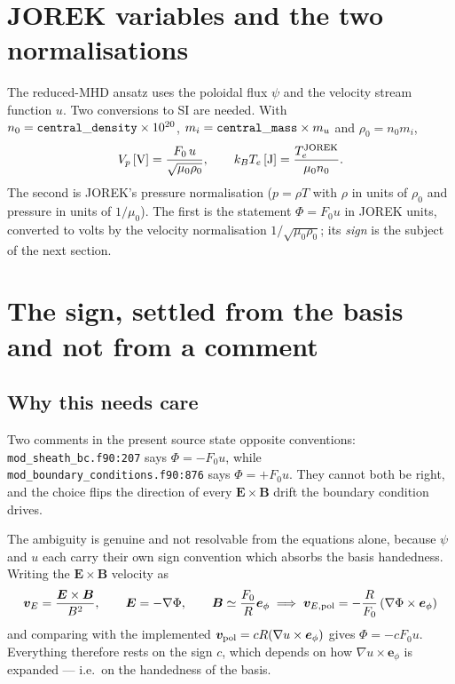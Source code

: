 \documentclass[11pt,a4paper]{article}
\newcommand{\code}[1]{\texttt{\small #1}}
\newcommand{\ephi}{\bm{e}_\phi}
\begin{document}
\section{JOREK variables and the two normalisations}

The reduced-MHD ansatz uses the poloidal flux $\psi$ and the velocity stream function $u$. Two
conversions to SI are needed. With $n_0={\tt central\_density}\times10^{20}$,
$m_i={\tt central\_mass}\times m_u$ and $\rho_0=n_0m_i$,
\begin{equation}
  V_p\,[\mathrm{V}]=\frac{F_0\,u}{\sqrt{\mu_0\rho_0}},
  \qquad
  k_BT_e\,[\mathrm{J}]=\frac{T_e^{\rm JOREK}}{\mu_0 n_0}.
  \label{eq:norm}
\end{equation}
The second is JOREK's pressure normalisation ($p=\rho T$ with $\rho$ in units of $\rho_0$ and
pressure in units of $1/\mu_0$). The first is the statement $\Phi=F_0u$ in JOREK units, converted
to volts by the velocity normalisation $1/\sqrt{\mu_0\rho_0}$; its \emph{sign} is the subject of
the next section.

\section{The sign, settled from the basis and not from a comment}
\label{sec:sign}

\subsection{Why this needs care}

Two comments in the present source state opposite conventions:
\code{mod\_sheath\_bc.f90:207} says $\Phi=-F_0u$, while
\code{mod\_boundary\_conditions.f90:876} says $\Phi=+F_0u$. They cannot both be right, and the
choice flips the direction of every $\bm{E}\times\bm{B}$ drift the boundary condition drives.

The ambiguity is genuine and not resolvable from the equations alone, because $\psi$ and $u$ each
carry their own sign convention which absorbs the basis handedness. Writing the $\bm{E}\times\bm{B}$
velocity as
\begin{equation}
  \bm{v}_E=\frac{\bm{E}\times\bm{B}}{B^2},\qquad \bm{E}=-\nabla\Phi,
  \qquad
  \bm{B}\simeq\frac{F_0}{R}\ephi
  \;\Longrightarrow\;
  \bm{v}_{E,\rm pol}=-\frac{R}{F_0}\left(\nabla\Phi\times\ephi\right)
\end{equation}
and comparing with the implemented $\bm{v}_{\rm pol}=cR(\nabla u\times\ephi)$ gives $\Phi=-cF_0u$.
Everything therefore rests on the sign $c$, which depends on how $\nabla u\times\ephi$ is expanded
--- i.e.\ on the handedness of the basis.
\end{document}
